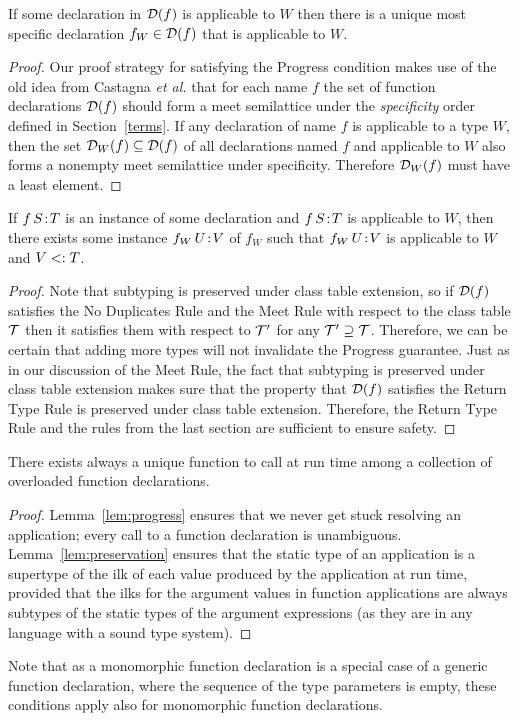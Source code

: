 \begin{lemma}[Progress]
\label{lem:progress}
If some declaration in $\mathcal{D}(f)$ is applicable to $W$
then there is a unique most specific declaration $f_W \in \mathcal{D}(f)$ that is applicable to $W$.
\end{lemma}
\begin{proof}
Our proof strategy for satisfying the Progress condition
makes use of the old idea from Castagna \emph{et al.} \cite{castagna95} that
for each name $f$ the set of function declarations $\mathcal{D}(f)$ should form a meet
semilattice under the \emph{specificity} order defined in
Section~\ref{terms}.
If any declaration of name $f$ is applicable to a type $W$,
then the set $\mathcal{D}_W(f) \subseteq \mathcal{D}(f)$
of all declarations named $f$ and applicable to $W$
also forms a nonempty meet semilattice under specificity. Therefore
$\mathcal{D}_W(f)$ must have a least element.
\end{proof}

\begin{lemma}[Preservation]
\label{lem:preservation}
If $\mbox{\ensuremath{{f}\,{S}\!:\!{T}}}$ is an instance of some declaration 
and $\mbox{\ensuremath{{f}\,{S}\!:\!{T}}}$ is applicable to $W$, 
then there exists some instance $\mbox{\ensuremath{{f_W}\,{U}\!:\!{V}}}$ of $f_W$ such that
$\mbox{\ensuremath{{f_W}\,{U}\!:\!{V}}}$ is applicable to $W$ and  $V <: T$.
\end{lemma}
\begin{proof}
Note that subtyping is preserved under class table extension,
so if $\mathcal{D}(f)$ satisfies the No Duplicates Rule and the Meet Rule
with respect to the class table $\mathcal{T}$ then it satisfies them
with respect to $\mathcal{T}'$ for any $\mathcal{T}' \supseteq \mathcal{T}$.
Therefore, we can be certain that adding more types will not
invalidate the Progress guarantee.
Just as in our discussion of the Meet Rule, the fact that subtyping is preserved
under class table extension makes sure that the property that $\mathcal{D}(f)$ satisfies
the Return Type Rule is preserved under class table extension. Therefore, the
Return Type Rule and the rules from the last section are sufficient to ensure safety.
\end{proof}

\begin{theorem}
\label{thm:safety}
There exists always a unique function to call at run time among a collection of overloaded function declarations.
\end{theorem}
\begin{proof}
Lemma~\ref{lem:progress} ensures that we never get stuck resolving an application;
every call to a function declaration is unambiguous.
Lemma~\ref{lem:preservation} ensures that the static type of an application
is a supertype of the ilk of each value produced by the application at run time,
provided that the ilks for the argument values in function applications 
are always subtypes of the static types of the argument expressions
(as they are in any language with a sound type system).
\end{proof}
Note that as a monomorphic function declaration is a special case of a generic function declaration,
where the sequence of the type parameters is empty,
these conditions apply also for monomorphic function declarations.

